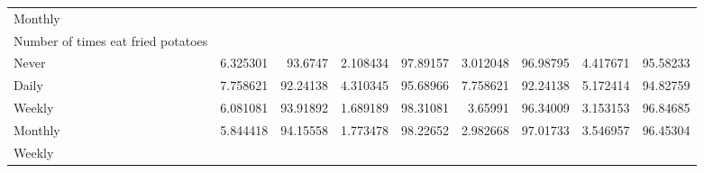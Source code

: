 \documentclass{article}
\begin{document}
\begin{table}[!h]
{\begin{tabular}{lllllllll}
				\multicolumn{1}{l}{\hspace{3em}Monthly} &
				\multicolumn{1}{|r}{} &
				\multicolumn{1}{r}{} &
				\multicolumn{1}{r}{} &
				\multicolumn{1}{r}{} &
				\multicolumn{1}{r}{} &
				\multicolumn{1}{r}{} &
				\multicolumn{1}{r}{} &
				\multicolumn{1}{r}{} \\
				\multicolumn{1}{l}{\hspace{4em}Number of times eat fried potatoes} &
				\multicolumn{1}{|r}{} &
				\multicolumn{1}{r}{} &
				\multicolumn{1}{r}{} &
				\multicolumn{1}{r}{} &
				\multicolumn{1}{r}{} &
				\multicolumn{1}{r}{} &
				\multicolumn{1}{r}{} &
				\multicolumn{1}{r}{} \\
				\multicolumn{1}{l}{\hspace{5em}Never} &
				\multicolumn{1}{|r}{6.325301} &
				\multicolumn{1}{r}{93.6747} &
				\multicolumn{1}{r}{2.108434} &
				\multicolumn{1}{r}{97.89157} &
				\multicolumn{1}{r}{3.012048} &
				\multicolumn{1}{r}{96.98795} &
				\multicolumn{1}{r}{4.417671} &
				\multicolumn{1}{r}{95.58233} \\
				\multicolumn{1}{l}{\hspace{5em}Daily} &
				\multicolumn{1}{|r}{7.758621} &
				\multicolumn{1}{r}{92.24138} &
				\multicolumn{1}{r}{4.310345} &
				\multicolumn{1}{r}{95.68966} &
				\multicolumn{1}{r}{7.758621} &
				\multicolumn{1}{r}{92.24138} &
				\multicolumn{1}{r}{5.172414} &
				\multicolumn{1}{r}{94.82759} \\
				\multicolumn{1}{l}{\hspace{5em}Weekly} &
				\multicolumn{1}{|r}{6.081081} &
				\multicolumn{1}{r}{93.91892} &
				\multicolumn{1}{r}{1.689189} &
				\multicolumn{1}{r}{98.31081} &
				\multicolumn{1}{r}{3.65991} &
				\multicolumn{1}{r}{96.34009} &
				\multicolumn{1}{r}{3.153153} &
				\multicolumn{1}{r}{96.84685} \\
				\multicolumn{1}{l}{\hspace{5em}Monthly} &
				\multicolumn{1}{|r}{5.844418} &
				\multicolumn{1}{r}{94.15558} &
				\multicolumn{1}{r}{1.773478} &
				\multicolumn{1}{r}{98.22652} &
				\multicolumn{1}{r}{2.982668} &
				\multicolumn{1}{r}{97.01733} &
				\multicolumn{1}{r}{3.546957} &
				\multicolumn{1}{r}{96.45304} \\
				\multicolumn{1}{l}{\hspace{1em}Weekly} &
				\multicolumn{1}{|r}{} &
				\multicolumn{1}{r}{} &
				\multicolumn{1}{r}{} &
				\multicolumn{1}{r}{} &
				\multicolumn{1}{r}{} &
				\multicolumn{1}{r}{} &
				\multicolumn{1}{r}{} &

\end{tabular}}
\end{table}
\end{document}
